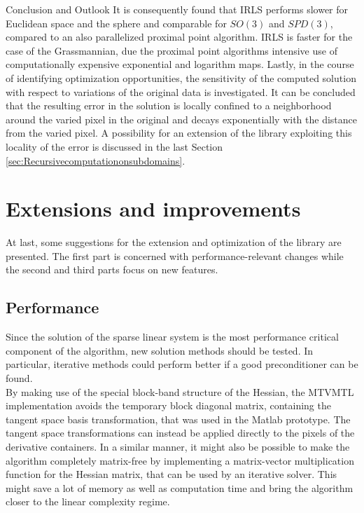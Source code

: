 \begin{chapter}{Conclusion and Outlook}
It is consequently found that IRLS performs slower for Euclidean space and the sphere and comparable for $SO(3)$
and $SPD(3)$, compared to an also parallelized proximal point algorithm. IRLS is faster for the case of the Grassmannian, due the proximal point algorithms intensive use of computationally expensive exponential and logarithm maps. Lastly, in the course of identifying optimization opportunities, the sensitivity
of the computed solution with respect to variations of the original data is investigated. 
It can be concluded that 
the resulting error in the solution is locally
confined to a neighborhood around the varied pixel in the original and decays exponentially with the distance from the varied pixel.
A possibility for an extension of the library exploiting this locality of the error is discussed in
the last Section \ref{sec:Recursivecomputationonsubdomains}. 

\section{Extensions and improvements} %
At last, some suggestions for the extension and optimization of the library are presented. 
The first part is concerned with performance-relevant changes while the second and third parts focus on
new features.

\label{sec:Extensions}
\subsection{Performance}
Since the solution of the sparse linear system is the most performance critical component of the algorithm, new 
solution methods should be tested. In particular, iterative methods could perform better if a good preconditioner
can be found. \\

By making use of the special block-band structure of the Hessian, the MTVMTL implementation avoids the temporary block diagonal 
matrix, containing the tangent space basis transformation, that was used in the Matlab prototype. The tangent space
transformations can instead be applied directly to the pixels of the derivative containers.
In a similar manner, it might also be possible to make the algorithm completely matrix-free by 
implementing a matrix-vector multiplication function for the Hessian matrix, that can be used by an iterative solver.
This might save a lot of memory as well as computation time and bring the algorithm closer to the linear complexity
regime.


\end{chapter}
